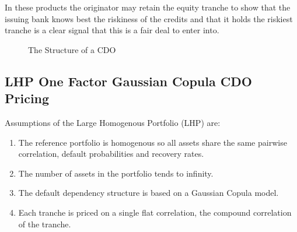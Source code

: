 In these products the originator may retain the equity tranche to show that the issuing bank knows best the riskiness of the credits and that it holds the riskiest tranche is a clear signal that this is a fair deal to enter into.


\begin{figure}
\centerline{}
\caption{\label{fig:cdostructure}The Structure of a CDO}
\end{figure}


\subsection{LHP One Factor Gaussian Copula CDO Pricing}

Assumptions of the Large Homogenous Portfolio (LHP) \cite{lp2007} are:
\begin{enumerate}
\item The reference portfolio is homogenous so all assets share the same pairwise correlation, default probabilities and recovery rates.
\item The number of assets in the portfolio tends to infinity.
\item The default dependency structure is based on a Gaussian Copula model.
\item Each tranche is priced on a single flat correlation, the compound correlation of the tranche.
\end{enumerate}

